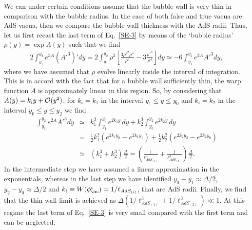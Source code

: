 \documentclass[aps,12pt, a4paper,nofootinbib]{revtex4}
\begin{document}
{We can under certain conditions assume that the bubble wall is very thin in comparison with the bubble radius. In the case of both false and  true vacua are AdS vacua, then we compare the bubble wall thickness with the AdS radii. Thus, let us first recast the last term of Eq.~\eqref{SE-3} by means of the `bubble radius' $\rho(y)=\exp {A(y)}$ such that we find
\begin{eqnarray}\label{last-term-SE-3}
2\int_{y_1}^{y_2}{e^{3A}(A'^{3})'dy}=2\int_{y_1}^{y_2}{\rho^3\left[\frac{3\rho'^2\rho''}{\rho^3}-3\frac{\rho'^3}{\rho^4} \right]dy}\simeq-6\int_{y_1}^{y_2}{e^{2A}A'^{3}dy},
\end{eqnarray}
where we have assumed that $\rho$ evolve linearly inside the interval of integration. This is in accord with the fact that for a bubble wall sufficiently thin, the warp function $A$ is approximately linear in this region. So, by considering that $A(y)=k_i y +{\cal O}(y^2)$, for $k_i=k_1$ in the interval $y_1\leq y\leq y_0$ and $k_i=k_2$ in the interval $y_0\leq y\leq y_2$ we find
\begin{eqnarray}\label{last-term-2-SE-3}
\int_{y_1}^{y_2}{e^{2A}A'^{3}dy}&\simeq& k_1^{3}\int_{y_1}^{y_0}{e^{2k_1y}\, dy}+k_2^{3}\int_{y_0}^{y_2}{e^{2k_2y}\, dy}\nonumber\\
&=&\frac12 k_1^2(e^{2k_1y_0}-e^{2k_1y_1})+\frac12 k_2^2(e^{2k_2y_2}-e^{2k_2y_0})\nonumber\\
&\simeq&(k_1^3+k_2^3)\frac{\Delta}{2}=\left(\frac{1}{\ell_{AdS_{(1)}}^3}+\frac{1}{\ell_{AdS_{(2)}}^3}\right)\frac{\Delta}{2}.
\end{eqnarray}
In the intermediate step we have assumed a linear approximation in the exponentials, whereas in the last step we have identified $y_0-y_1\approx \Delta/2$, $y_2-y_0\approx\Delta/2$ and $k_i\equiv W(\phi^{i}_{\rm vac})=1/\ell_{AdS_{(i)}}$, that are AdS radii. Finally, we find that the thin wall limit is achieved as $\Delta(1/\ell_{AdS_{(1)}}^3+1/\ell_{AdS_{(2)}}^3)\ll1$. At this regime the last
term of Eq.~\eqref{SE-3} is very small compared with the first term and  can be neglected.

}
\end{document}
